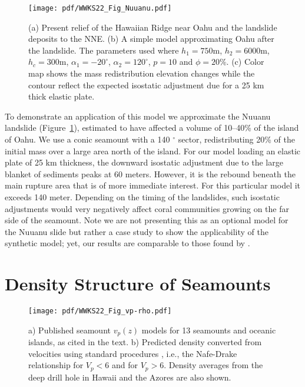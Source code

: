 \begin{figure}[h]
\centering
\texttt{[image: pdf/WWKS22\_Fig\_Nuuanu.pdf]}
\caption{(a) Present relief of the Hawaiian Ridge near Oahu and the landslide deposits to the NNE.
(b) A simple model approximating Oahu after the landslide.  The parameters used where $h_1 = 750$m, $h_2 = 6000$m,
$h_c = 300$m, $\alpha_1 = -20^{\circ}$, $\alpha_2 = 120^{\circ}$, $p = 10$ and $\phi = 20$\%.
(c) Color map shows the mass redistribution elevation changes while the contour reflect the expected isostatic adjustment due for a 25 km
thick elastic plate.}
\label{WWKS22_Fig_Nuuanu}
\end{figure}
To demonstrate an application of this model we approximate the Nuuanu landslide (Figure~\ref{WWKS22_Fig_Nuuanu}),
estimated to have affected a volume of 10--40\% of the island of Oahu. We use a conic seamount with a 140 $^{\circ}$ sector,
redistributing 20\% of the initial mass over a large area north of the island.  For our model loading an elastic plate
of 25 km thickness, the downward isostatic adjustment due to the large blanket of sediments peaks at 60 meters.  However, it is
the rebound beneath the main rupture area that is of more immediate interest.  For this particular model it exceeds
140 meter.  Depending on the timing of the landslides, such isostatic adjustments would very negatively affect coral
communities growing on the far side of the seamount. Note we are not presenting this as an optional model for the Nuuanu
slide but rather a case study to show the applicability of the synthetic model; yet, our results are comparable to those found
by \citet{SW2000}.

\section{Density Structure of Seamounts}

\begin{figure}[h]
\centering
\texttt{[image: pdf/WWKS22\_Fig\_vp-rho.pdf]}
\caption{a) Published seamount $v_p(z)$ models for 13 seamounts and oceanic islands, as cited in the text.
b) Predicted density converted from velocities using standard procedures \citep{B2005}, i.e., the Nafe-Drake relationship \citep{LND70}
for $V_p < 6$ and \citet{CM1995} for $V_p >6$. Density averages from the deep drill hole
in Hawaii \citep{JM2001} and the Azores \citep{H1979} are also shown.}
\label{WWKS22_Fig_vp-rho}
\end{figure}

